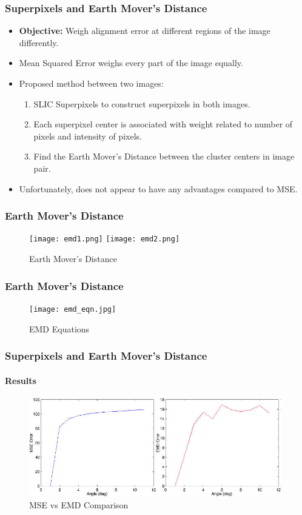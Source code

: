 \documentclass{beamer}
\begin{document}
\begin{frame}
\frametitle{Superpixels and Earth Mover's Distance}
\begin{itemize}
\item \textbf{Objective:} Weigh alignment error at different regions of the image differently.
\item Mean Squared Error weighs every part of the image equally.
\item Proposed method between two images:
\begin{enumerate}
\item SLIC Superpixels to construct superpixels in both images.
\item Each superpixel center is associated with weight related to number of pixels and intensity of pixels.
\item Find the Earth Mover's Distance between the cluster centers in image pair.
\end{enumerate}
\item Unfortunately, does not appear to have any advantages compared to MSE.
\end{itemize}
\end{frame}

\begin{frame}
\frametitle{Earth Mover's Distance}
\begin{figure}[p]
	\centering
	\texttt{[image: emd1.png]}
	\texttt{[image: emd2.png]}
	\caption{Earth Mover's Distance}
	\label{fig:EMD}
\end{figure}
\end{frame}

\begin{frame}
\frametitle{Earth Mover's Distance}
\begin{figure}[p]
	\centering
	\texttt{[image: emd\_eqn.jpg]}
	\caption{EMD Equations}
	\label{fig:EMDEquations}
\end{figure}
\end{frame}

\begin{frame}
\frametitle{Superpixels and Earth Mover's Distance}
\framesubtitle{Results}
\begin{figure}[p]
	\centering
	\includegraphics[width=11cm]{emderror.jpg}
	\caption{MSE vs EMD Comparison}
	\label{fig:Error Comparison}
\end{figure}
\end{frame}
\end{document}
